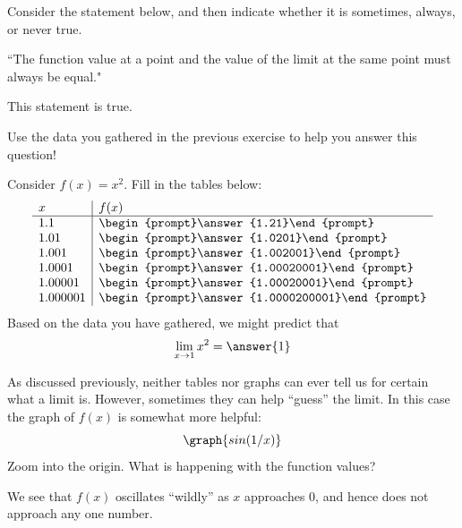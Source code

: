 \documentclass[handout]{ximera}
\begin{document}
\begin{exercise}

Consider the statement below, and then indicate whether it is sometimes, always, or never true.

``The function value at a point and the value of the limit at the same point must always be equal."

This statement is  true.

\begin{hint}

Use the data you gathered in the previous exercise to help you answer this question!  

\end{hint} 

\end{exercise}

\begin{exercise}
Consider $f(x) = x^2$. Fill in the 
  tables below:
  \[
  \begin{array}{l|l}
    x      & f(x)      \\ \hline
    1.1    & \begin{prompt}\answer{1.21}\end{prompt}\\
    1.01   & \begin{prompt}\answer{1.0201}\end{prompt}\\
    1.001  & \begin{prompt}\answer{1.002001}\end{prompt}\\
    1.0001 & \begin{prompt}\answer{1.00020001}\end{prompt}\\
    1.00001 & \begin{prompt}\answer{1.00020001}\end{prompt}\\
    1.000001 & \begin{prompt}\answer{1.0000200001}\end{prompt}
  \end{array}
  \]
  Based on the data you have gathered, we might predict that 
  \[
  \lim_{x\to 1} x^2 = \answer{1}
  \]
  
    \begin{feedback}
    As discussed previously, neither tables nor graphs can ever tell us for certain what a limit is. However, sometimes they can help ``guess'' the limit. In this case the graph of $f(x)$ is somewhat more helpful:
\[
\graph{sin(1/x)}
\]
  Zoom into the origin. What is happening with the function values? 
  
  We see that $f(x)$ oscillates ``wildly'' as $x$ approaches $0$, and hence does not approach any one number.
  \end{feedback}

\end{exercise}
\end{document}
